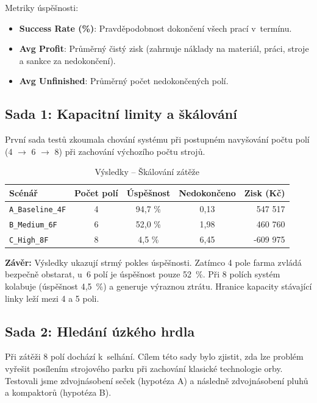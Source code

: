 \documentclass[11pt,a4paper]{article}
\begin{document}
Metriky úspěšnosti:

\begin{itemize}
    \item \textbf{Success Rate (\%)}: Pravděpodobnost dokončení všech prací v~termínu.
    \item \textbf{Avg Profit}: Průměrný čistý zisk (zahrnuje náklady na materiál, práci, stroje a sankce za nedokončení).
    \item \textbf{Avg Unfinished}: Průměrný počet nedokončených polí.
\end{itemize}

\subsection{Sada 1: Kapacitní limity a škálování}

První sada testů zkoumala chování systému při postupném navyšování počtu polí (4 $\to$ 6 $\to$ 8) při zachování výchozího počtu strojů.

\begin{table}[H]
    \centering
    \begin{tabular}{|l|c|c|c|r|}
        \hline
        \textbf{Scénář} & \textbf{Počet polí} & \textbf{Úspěšnost} & \textbf{Nedokončeno} & \textbf{Zisk (Kč)} \\ \hline
        \texttt{A\_Baseline\_4F} & 4 & 94,7 \% & 0,13 & 547 517 \\ \hline
        \texttt{B\_Medium\_6F} & 6 & 52,0 \% & 1,98 & 460 760 \\ \hline
        \texttt{C\_High\_8F} & 8 & 4,5 \% & 6,45 & -609 975 \\ \hline
    \end{tabular}
    \caption{Výsledky -- Škálování zátěže}
    \label{tab:scaling}
\end{table}

\textbf{Závěr:} Výsledky ukazují strmý pokles úspěšnosti. Zatímco 4 pole farma zvládá bezpečně obstarat, u~6 polí je úspěšnost pouze 52~\%. Při 8 polích systém kolabuje (úspěšnost 4,5~\%) a generuje výraznou ztrátu. Hranice kapacity stávající linky leží mezi 4 a 5 poli.

\subsection{Sada 2: Hledání úzkého hrdla}

Při zátěži 8 polí dochází k~selhání. Cílem této sady bylo zjistit, zda lze problém vyřešit posílením strojového parku při zachování klasické technologie orby. Testovali jsme zdvojnásobení seček (hypotéza A) a následně zdvojnásobení pluhů a kompaktorů (hypotéza B).
\end{document}
